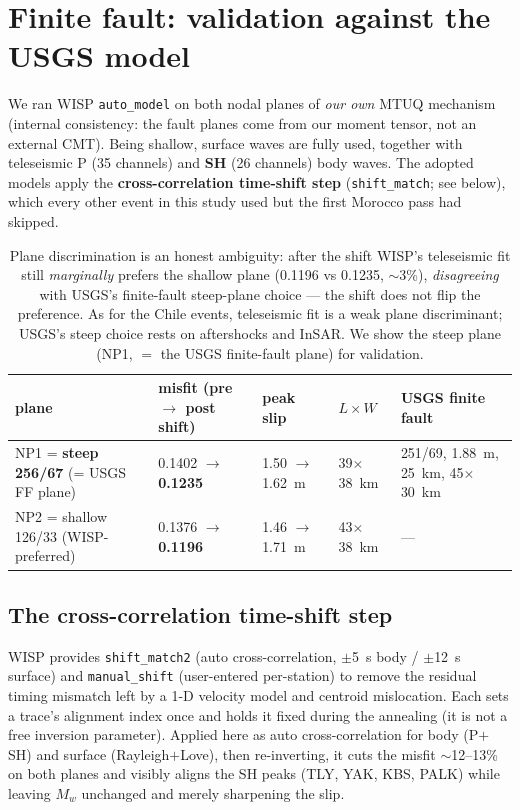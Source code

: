 \documentclass[11pt]{article}
\begin{document}
\section{Finite fault: validation against the USGS model}
We ran WISP \texttt{auto\_model} on both nodal planes of \emph{our own} MTUQ mechanism (internal
consistency: the fault planes come from our moment tensor, not an external CMT). Being shallow,
surface waves are fully used, together with teleseismic P (35 channels) and \textbf{SH} (26 channels) body waves.
The adopted models apply the \textbf{cross-correlation time-shift step} (\texttt{shift\_match}; see
below), which every other event in this study used but the first Morocco pass had skipped.

\begin{table}[H]\centering\small
\begin{tabular}{lllll}
\toprule
plane & misfit (pre $\to$ post shift) & peak slip & $L\times W$ & USGS finite fault \\
\midrule
NP1 = \textbf{steep 256/67} (= USGS FF plane) & 0.1402 $\to$ \textbf{0.1235} & 1.50 $\to$ 1.62~m & 39$\times$38~km & 251/69, 1.88~m, 25~km, 45$\times$30~km \\
NP2 = shallow 126/33 (WISP-preferred) & 0.1376 $\to$ \textbf{0.1196} & 1.46 $\to$ 1.71~m & 43$\times$38~km & --- \\
\bottomrule
\end{tabular}
\caption{Plane discrimination is an honest ambiguity: after the shift WISP's teleseismic fit still
\emph{marginally} prefers the shallow plane (0.1196 vs 0.1235, $\sim$3\%), \emph{disagreeing} with
USGS's finite-fault steep-plane choice --- the shift does not flip the preference. As for the Chile
events, teleseismic fit is a weak plane discriminant; USGS's steep choice rests on aftershocks and
InSAR. We show the steep plane (NP1, $=$ the USGS finite-fault plane) for validation.}
\end{table}

\subsection*{The cross-correlation time-shift step}
WISP provides \texttt{shift\_match2} (auto cross-correlation, $\pm$5~s body / $\pm$12~s surface) and
\texttt{manual\_shift} (user-entered per-station) to remove the residual timing mismatch left by a
1-D velocity model and centroid mislocation. Each sets a trace's alignment index once and holds it
fixed during the annealing (it is not a free inversion parameter). Applied here as auto
cross-correlation for body (P$+$SH) and surface (Rayleigh$+$Love), then re-inverting, it cuts the
misfit $\sim$12--13\% on both planes and visibly aligns the SH peaks (TLY, YAK, KBS, PALK) while
leaving $M_w$ unchanged and merely sharpening the slip.
\end{document}
